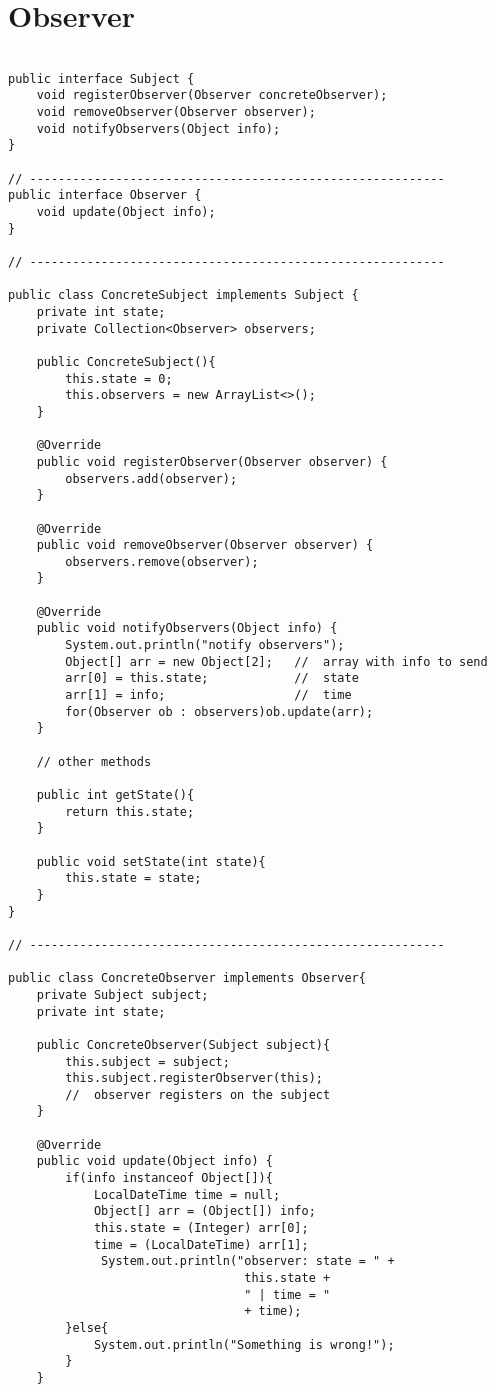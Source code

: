 \newpage
\section{Observer}
\label{anexo:observer}

\begin{verbatim}

public interface Subject {
    void registerObserver(Observer concreteObserver);
    void removeObserver(Observer observer);
    void notifyObservers(Object info);
}

// ----------------------------------------------------------
public interface Observer {
    void update(Object info);
}

// ----------------------------------------------------------

public class ConcreteSubject implements Subject {
    private int state;
    private Collection<Observer> observers;

    public ConcreteSubject(){
        this.state = 0;
        this.observers = new ArrayList<>();
    }

    @Override
    public void registerObserver(Observer observer) {
        observers.add(observer);
    }

    @Override
    public void removeObserver(Observer observer) {
        observers.remove(observer);
    }

    @Override
    public void notifyObservers(Object info) {
        System.out.println("notify observers");
        Object[] arr = new Object[2];   //  array with info to send
        arr[0] = this.state;            //  state
        arr[1] = info;                  //  time
        for(Observer ob : observers)ob.update(arr);
    }

    // other methods

    public int getState(){
        return this.state;
    }

    public void setState(int state){
        this.state = state;
    }
}

// ----------------------------------------------------------

public class ConcreteObserver implements Observer{
    private Subject subject;
    private int state;

    public ConcreteObserver(Subject subject){
        this.subject = subject;
        this.subject.registerObserver(this);
        //  observer registers on the subject
    }

    @Override
    public void update(Object info) {
        if(info instanceof Object[]){
            LocalDateTime time = null;
            Object[] arr = (Object[]) info;
            this.state = (Integer) arr[0];
            time = (LocalDateTime) arr[1];
             System.out.println("observer: state = " +
                                 this.state + 
                                 " | time = " 
                                 + time);
        }else{
            System.out.println("Something is wrong!");    
        }
    }


\end{verbatim}
